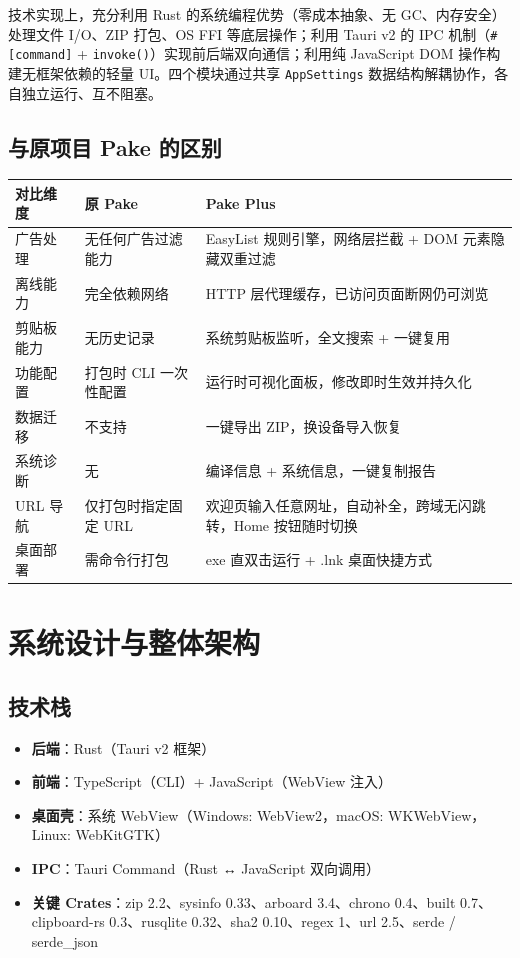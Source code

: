 \documentclass[12pt,a4paper]{ctexart}
\begin{document}
技术实现上，充分利用 Rust 的系统编程优势（零成本抽象、无 GC、内存安全）处理文件 I/O、ZIP 打包、OS FFI 等底层操作；利用 Tauri v2 的 IPC 机制（\texttt{\#[command]} + \texttt{invoke()}）实现前后端双向通信；利用纯 JavaScript DOM 操作构建无框架依赖的轻量 UI。四个模块通过共享 \texttt{AppSettings} 数据结构解耦协作，各自独立运行、互不阻塞。

\subsection{与原项目 Pake 的区别}

\begin{table}[H]
\centering
\small
\begin{tabularx}{\textwidth}{lXX}
\toprule
对比维度 & 原 Pake & Pake Plus \\
\midrule
广告处理   & 无任何广告过滤能力 & EasyList 规则引擎，网络层拦截 + DOM 元素隐藏双重过滤 \\
离线能力   & 完全依赖网络 & HTTP 层代理缓存，已访问页面断网仍可浏览 \\
剪贴板能力 & 无历史记录 & 系统剪贴板监听，全文搜索 + 一键复用 \\
功能配置   & 打包时 CLI 一次性配置 & 运行时可视化面板，修改即时生效并持久化 \\
数据迁移   & 不支持 & 一键导出 ZIP，换设备导入恢复 \\
系统诊断   & 无 & 编译信息 + 系统信息，一键复制报告 \\
URL 导航   & 仅打包时指定固定 URL & 欢迎页输入任意网址，自动补全，跨域无闪跳转，Home 按钮随时切换 \\
桌面部署   & 需命令行打包 & exe 直双击运行 + .lnk 桌面快捷方式 \\
\bottomrule
\end{tabularx}
\end{table}

\section{系统设计与整体架构}

\subsection{技术栈}

\begin{itemize}
  \item \textbf{后端}：Rust（Tauri v2 框架）
  \item \textbf{前端}：TypeScript（CLI）+ JavaScript（WebView 注入）
  \item \textbf{桌面壳}：系统 WebView（Windows: WebView2，macOS: WKWebView，Linux: WebKitGTK）
  \item \textbf{IPC}：Tauri Command（Rust ↔ JavaScript 双向调用）
  \item \textbf{关键 Crates}：zip 2.2、sysinfo 0.33、arboard 3.4、chrono 0.4、built 0.7、clipboard-rs 0.3、rusqlite 0.32、sha2 0.10、regex 1、url 2.5、serde / serde\_json
\end{itemize}
\end{document}
